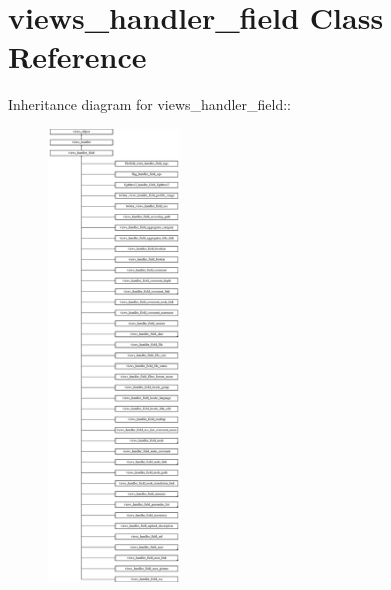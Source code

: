 \hypertarget{classviews__handler__field}{
\section{views\_\-handler\_\-field Class Reference}
\label{classviews__handler__field}
}
Inheritance diagram for views\_\-handler\_\-field::\begin{figure}[H]
\begin{center}
\leavevmode
\includegraphics[height=12cm]{classviews__handler__field}
\end{center}
\end{figure}
